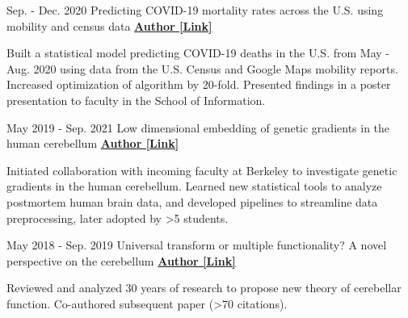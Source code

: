 \begin{cventries}
    
    
 \cventry
   {Sep. - Dec. 2020} %
   {Predicting COVID-19 mortality rates across the U.S. using mobility and census data} %
    {\href{https://drive.google.com/file/d/1l9TLGLmstkJsvOJQPxHe_f35b4fEkDU4/view}{\textbf{Author [Link]}}}
    {}
    {
      \begin{cvitems} %
      	\item {Built a statistical model predicting COVID-19 deaths in the U.S. from May - Aug. 2020 using data from the U.S. Census and Google Maps mobility reports. Increased optimization of algorithm by 20-fold. Presented findings in a poster presentation to faculty in the School of Information.}
      \end{cvitems}
    }
    
  \cventry
    {May 2019 - Sep. 2021} %
    {Low dimensional embedding of genetic gradients in the human cerebellum} %
    {\href{https://papers.ssrn.com/sol3/papers.cfm?abstract_id=3797269}{\textbf{Author [Link]}}}
    {}
    {
      \begin{cvitems} %
      	\item {Initiated collaboration with incoming faculty at Berkeley to investigate genetic gradients in the human cerebellum. Learned new statistical tools to analyze postmortem human brain data, and developed pipelines to streamline data preprocessing, later adopted by >5 students.}
      \end{cvitems}
    }
    
  \cventry
    {May 2018 - Sep. 2019} %
    {Universal transform or multiple functionality? A novel perspective on the cerebellum} %
    {\href{https://www.sciencedirect.com/science/article/pii/S0896627319303782}{\textbf{Author [Link]}}}
    {}
    {
      \begin{cvitems} %
      	\item {Reviewed and analyzed 30 years of research to propose new theory of cerebellar function. Co-authored subsequent paper (>70 citations).}
      \end{cvitems}
    }
 
\end{cventries}
